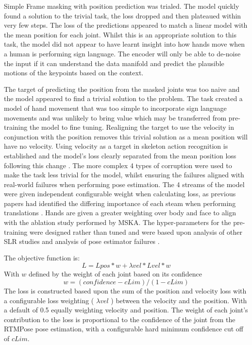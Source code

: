 \documentclass{article}
\begin{document}
Simple Frame masking with position prediction was trialed. The model quickly found a solution to the trivial task, the loss dropped and then plateaued within very few steps.  The loss of the predictions appeared to match a linear model with the mean position for each joint. Whilst this is an appropriate solution to this task, the model did not appear to have learnt insight into how hands move when a human is performing sign language. The encoder will only be able to de-noise the input if it can understand the data manifold and predict the plausible motions of the keypoints based on the context. 
 
The target of predicting the position from the masked joints was too naive and the model appeared to find a trivial solution to the problem. The task created a model of hand movement that was too simple to incorporate sign language movements and was unlikely to bring value which may be transferred from pre-training the model to fine tuning. Realigning the target to use the velocity in conjunction with the position removes this trivial solution as a mean position will have no velocity. Using velocity as a target in skeleton action recognition is established and the model's loss clearly separated from the mean position loss following this change \cite{shi_decoupled_2020}.  The more complex 4 types of corruption were used to make the task less trivial for the model, whilst ensuring the failures aligned with real-world failures when performing pose estimation. The 4 streams of the model were given independent configurable weight when calculating loss, as previous papers had identified the differing importance of each steam when performing translations \cite{guan_multi-stream_2024}. Hands are given a greater weighting over body and face to align with the ablation study performed by MSKA. The hyper-parameters for the pre-training were designed rather than tuned and were based upon analysis of other SLR studies and analysis of pose estimator failures \cite{moryossef_evaluating_2021}. 

 The objective function is:
 \begin{equation}
  L = Lpos* w + \lambda vel * Lvel * w 
  \end{equation}
With $w$ defined by the weight of each joint based on its confidence
   \begin{equation}
 w = (confidence - cLim) / (1 - cLim)
   \end{equation}
The loss is constructed based upon the sum of the position and velocity loss with a configurable loss weighting ( $ \lambda vel$ ) between the velocity and the position. With a default of 0.5 equally weighting velocity and position.  The weight of each joint's contribution to the loss is proportional to the confidence of the joint from the RTMPose pose estimation, with a configurable hard minimum confidence cut off of $cLim$.
\end{document}
